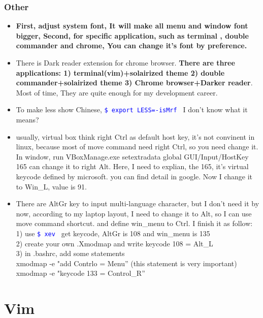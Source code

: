 \documentclass[a4paper,12pt,twoside]{book}
\newcommand{\linuxcommand}[1]{\texttt{\textcolor{blue}{\$ #1 \Pisymbol{psy}{191}}}}
\begin{document}
\subsection{Other}
\begin{itemize}
		\item \textbf{First, adjust system font, It will make all menu and window font bigger, Second, for specific application, such as terminal , double commander and chrome, You can change it's font by preference. }

		\item There is Dark reader extension for chrome browser. \textbf{There are three applications: 1) terminal(vim)+solairized theme 2) double commander+solairized theme 3) Chrome browser+Darker reader}. Most of time, They are quite enough for my development career. 

    \item To make less show Chinese, \linuxcommand{export LESS=-isMrf} I don't know what it means?

    \item usually, virtual box think right Ctrl as default host key, it's not convinent in linux, because most of move command need right Ctrl, so you need change it.  In window, run VBoxManage.exe setextradata global GUI/Input/HostKey 165 can change it to right Alt. Here, I need to explian, the 165, it's virtual keycode defined by microsoft. you can find detail in google. Now I change it to Win\_L, value is 91.

\item There are AltGr key to input multi-language character, but I don't need it by now, according to my laptop layout, I need to change it to Alt, so I can use move command shortcut. and define win\_menu to Ctrl. I finish it as follow: \\
	1) use \linuxcommand{xev} get keycode, AltGr is 108 and win\_menu is 135 \\
	2) create your own .Xmodmap and write keycode 108 = Alt\_L\\
	3) in .bashrc, add some statements\\
	xmodmap -e "add Contrlo = Menu'' (this statement is very important)\\
	xmodmap -e "keycode 133 = Control\_R''\\
	\end{itemize}	

	
\chapter{Vim}
\end{document}
